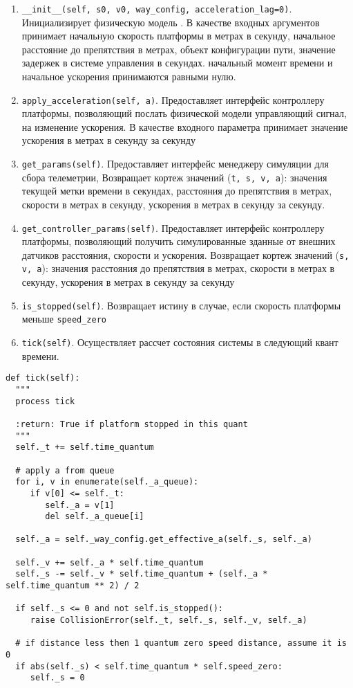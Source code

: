 \begin{enumerate}[label=\arabic*)]
	\item  \lstinline!__init__(self, s0, v0, way_config, acceleration_lag=0)!. Инициализирует физическую модель . В качестве входных аргументов принимает начальную скорость платформы в метрах в секунду, начальное расстояние до препятствия в метрах, объект конфигурации пути, значение задержек в системе управления в секундах. начальный момент времени и начальное ускорения принимаются равными нулю.
	\item  \lstinline!apply_acceleration(self, a)!. Предоставляет интерфейс контроллеру платформы, позволяющий послать физической модели управляющий сигнал, на изменение ускорения. В качестве входного параметра принимает значение ускорения в метрах в секунду за секунду
	\item  \lstinline!get_params(self)!. Предоставляет интерфейс менеджеру симуляции для сбора телеметрии, Возвращает кортеж значений (\lstinline!t, s, v, a!): значения текущей метки времени в секундах, расстояния до препятствия в метрах, скорости в метрах в секунду, ускорения в метрах в секунду за секунду.
	\item  \lstinline!get_controller_params(self)!. Предоставляет интерфейс контроллеру платформы, позволяющий получить симулированные зданные от внешних датчиков расстояния, скорости и ускорения. Возвращает кортеж значений (\lstinline!s, v, a!): значения расстояния до препятствия в метрах, скорости в метрах в секунду, ускорения в метрах в секунду за секунду
	\item  \lstinline!is_stopped(self)!. Возвращает истину в случае, если скорость платформы меньше \lstinline!speed_zero!
	\item  \lstinline!tick(self)!.  Осуществляет рассчет состояния системы в следующий квант времени.
\end{enumerate}



\begin{lstlisting}[style=pythonstyle,caption={  }, label=lst:func:1]
def tick(self):
  """
  process tick

  :return: True if platform stopped in this quant
  """
  self._t += self.time_quantum

  # apply a from queue
  for i, v in enumerate(self._a_queue):
     if v[0] <= self._t:
        self._a = v[1]
        del self._a_queue[i]

  self._a = self._way_config.get_effective_a(self._s, self._a)

  self._v += self._a * self.time_quantum
  self._s -= self._v * self.time_quantum + (self._a * self.time_quantum ** 2) / 2

  if self._s <= 0 and not self.is_stopped():
     raise CollisionError(self._t, self._s, self._v, self._a)

  # if distance less then 1 quantum zero speed distance, assume it is 0
  if abs(self._s) < self.time_quantum * self.speed_zero:
     self._s = 0
\end{lstlisting}

